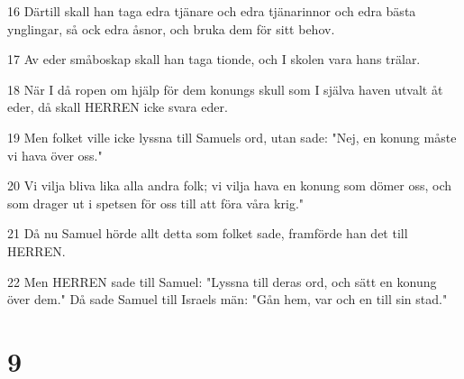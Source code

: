 \par 16 Därtill skall han taga edra tjänare och edra tjänarinnor och edra bästa ynglingar, så ock edra åsnor, och bruka dem för sitt behov.
\par 17 Av eder småboskap skall han taga tionde, och I skolen vara hans trälar.
\par 18 När I då ropen om hjälp för dem konungs skull som I själva haven utvalt åt eder, då skall HERREN icke svara eder.
\par 19 Men folket ville icke lyssna till Samuels ord, utan sade: "Nej, en konung måste vi hava över oss."
\par 20 Vi vilja bliva lika alla andra folk; vi vilja hava en konung som dömer oss, och som drager ut i spetsen för oss till att föra våra krig."
\par 21 Då nu Samuel hörde allt detta som folket sade, framförde han det till HERREN.
\par 22 Men HERREN sade till Samuel: "Lyssna till deras ord, och sätt en konung över dem." Då sade Samuel till Israels män: "Gån hem, var och en till sin stad."

\chapter{9}

